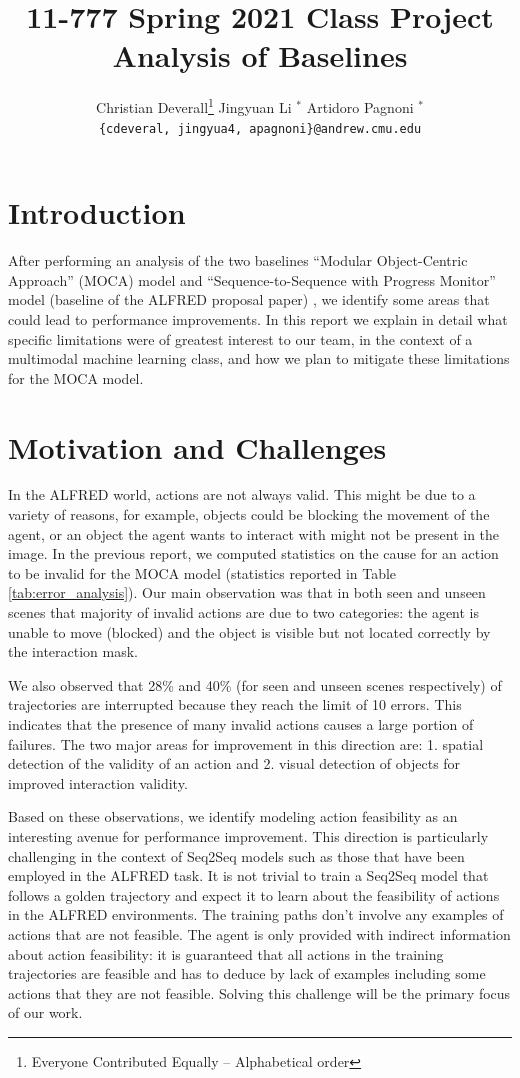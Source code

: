 \documentclass[11pt,a4paper]{article}
\title{11-777 Spring 2021 Class Project\\
Analysis of Baselines}
\author{
  Christian Deverall\thanks{\hspace{4pt}Everyone Contributed Equally -- Alphabetical order} \hspace{2em} Jingyuan Li $^*$ \hspace{2em} Artidoro Pagnoni $^*$ \\
  \texttt{\{cdeveral, jingyua4, apagnoni\}@andrew.cmu.edu}
  }
\date{}
\begin{document}
\maketitle


\section{Introduction}

After performing an analysis of the two baselines ``Modular Object-Centric Approach'' (MOCA) \citep{singh2020moca} model and  ``Sequence-to-Sequence with Progress Monitor'' model (baseline of the ALFRED proposal paper) \citep{ALFRED20}, we identify some areas that could lead to performance improvements. In this report we explain in detail what specific limitations were of greatest interest to our team, in the context of a multimodal machine learning class, and how we plan to mitigate these limitations for the MOCA model. 

\section{Motivation and Challenges}
In the ALFRED world, actions are not always valid. This might be due to a variety of reasons, for example, objects could be blocking the movement of the agent, or an object the agent wants to interact with might not be present in the image.   
In the previous report, we computed statistics on the cause for an action to be invalid for the MOCA model (statistics reported in Table \ref{tab:error_analysis}).
Our main observation was that in both seen and unseen scenes that majority of invalid actions are due to two categories: the agent is unable to move (blocked) and the object is visible but not located correctly by the interaction mask. 

We also observed that 28\% and 40\% (for seen and unseen scenes respectively) of trajectories are interrupted because they reach the limit of 10 errors. This indicates that the presence of many invalid actions causes a large portion of failures. The two major areas for improvement in this direction are: 1. spatial detection of the validity of an action and 2. visual detection of objects for improved interaction validity.

Based on these observations, we identify modeling action feasibility as an interesting avenue for performance improvement. This direction is particularly challenging in the context of Seq2Seq models such as those that have been employed in the ALFRED task. It is not trivial to train a Seq2Seq model that follows a golden trajectory and expect it to learn about the feasibility of actions in the ALFRED environments. The training paths don't involve any examples of actions that are not feasible. The agent is only provided with indirect information about action feasibility: it is guaranteed that all actions in the training trajectories are feasible and has to deduce by lack of examples including some actions that they are not feasible. Solving this challenge will be the primary focus of our work.
\end{document}
